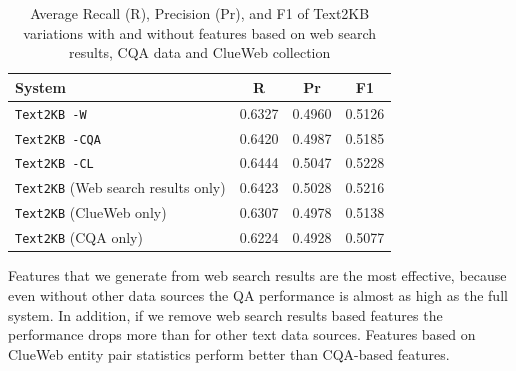 \begin{table}
\caption{Average Recall (R), Precision (Pr), and F1 of Text2KB variations with and without features based on web search results, CQA data and ClueWeb collection}
\label{table:ablation:features}
\begin{tabular}{| p{4cm} | c | c | c | }
\hline
System & R & Pr &  F1 \\
\hline
\texttt{Text2KB -W} & 0.6327 & 0.4960 & 0.5126 \\
\texttt{Text2KB -CQA} & 0.6420 & 0.4987 & 0.5185 \\
\texttt{Text2KB -CL} & 0.6444 & 0.5047 & 0.5228 \\
\hline
\texttt{Text2KB} (Web search results only) & 0.6423 & 0.5028 & 0.5216 \\
\texttt{Text2KB} (ClueWeb only) & 0.6307 & 0.4978 & 0.5138 \\
\texttt{Text2KB} (CQA only) & 0.6224 & 0.4928 & 0.5077 \\
\hline
\end{tabular}
\end{table}

Features that we generate from web search results are the most effective, because even without other data sources the QA performance is almost as high as the full system.
In addition, if we remove web search results based features the performance drops more than for other text data sources.
Features based on ClueWeb entity pair statistics perform better than CQA-based features.

